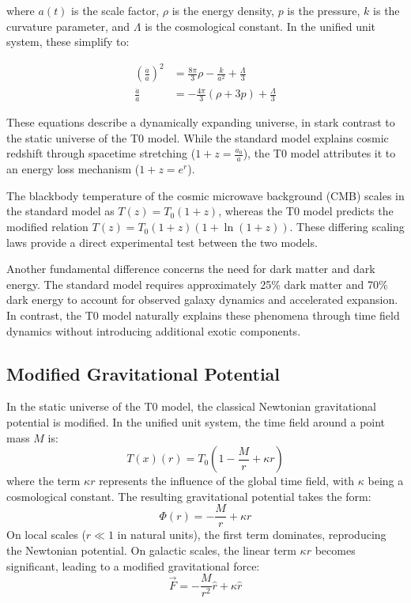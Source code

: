 \documentclass[12pt,a4paper]{article}
\newcommand{\Tfield}{T(x)}
\newcommand{\Tzero}{T_0}
\begin{document}
	where \(a(t)\) is the scale factor, \(\rho\) is the energy density, \(p\) is the pressure, \(k\) is the curvature parameter, and \(\Lambda\) is the cosmological constant. In the unified unit system, these simplify to:
	
	\begin{align}
		\left(\frac{\dot{a}}{a}\right)^2 &= \frac{8\pi}{3}\rho - \frac{k}{a^2} + \frac{\Lambda}{3} \\
		\frac{\ddot{a}}{a} &= -\frac{4\pi}{3}(\rho + 3p) + \frac{\Lambda}{3}
	\end{align}
	
	These equations describe a dynamically expanding universe, in stark contrast to the static universe of the T0 model. While the standard model explains cosmic redshift through spacetime stretching (\(1+z = \frac{a_0}{a}\)), the T0 model attributes it to an energy loss mechanism (\(1+z = e^r\)).
	
	The blackbody temperature of the cosmic microwave background (CMB) scales in the standard model as \(T(z) = T_0(1+z)\), whereas the T0 model predicts the modified relation \(T(z) = T_0(1+z)(1+\ln(1+z))\). These differing scaling laws provide a direct experimental test between the two models.
	
	Another fundamental difference concerns the need for dark matter and dark energy. The standard model requires approximately 25\% dark matter and 70\% dark energy to account for observed galaxy dynamics and accelerated expansion. In contrast, the T0 model naturally explains these phenomena through time field dynamics without introducing additional exotic components.
	\subsection{Modified Gravitational Potential}

In the static universe of the T0 model, the classical Newtonian gravitational potential is modified. In the unified unit system, the time field around a point mass \(M\) is:
\begin{equation}
	\Tfield(r) = \Tzero\left(1 - \frac{M}{r} + \kappa r\right)
\end{equation}
where the term \(\kappa r\) represents the influence of the global time field, with \(\kappa\) being a cosmological constant. The resulting gravitational potential takes the form:
\begin{equation}
	\Phi(r) = -\frac{M}{r} + \kappa r
\end{equation}
On local scales (\(r \ll 1\) in natural units), the first term dominates, reproducing the Newtonian potential. On galactic scales, the linear term \(\kappa r\) becomes significant, leading to a modified gravitational force:
\begin{equation}
	\vec{F} = -\frac{M}{r^2} \hat{r} + \kappa \hat{r}
\end{equation}
	
\end{document}
